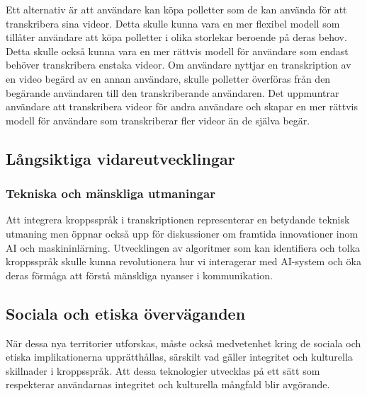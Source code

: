 Ett alternativ är att användare kan köpa polletter som de kan använda för att
transkribera sina videor. Detta skulle kunna vara en mer flexibel modell som
tillåter användare att köpa polletter i olika storlekar beroende på deras
behov. Detta skulle också kunna vara en mer rättvis modell för användare som
endast behöver transkribera enstaka videor. Om användare nyttjar en
transkription av en video begärd av en annan användare, skulle polletter
överföras från den begärande användaren till den transkriberande användaren.
Det uppmuntrar användare att transkribera videor för andra användare och
skapar en mer rättvis modell för användare som transkriberar fler videor än de
själva begär.

\subsection{Långsiktiga vidareutvecklingar}

\subsubsection{Tekniska och mänskliga utmaningar}
Att integrera kroppsspråk i transkriptionen representerar en betydande teknisk
utmaning men öppnar också upp för diskussioner om framtida innovationer inom
AI och maskininlärning. Utvecklingen av algoritmer som kan identifiera och
tolka kroppsspråk skulle kunna revolutionera hur vi interagerar med AI-system
och öka deras förmåga att förstå mänskliga nyanser i kommunikation.

\subsection{Sociala och etiska överväganden}
När dessa nya territorier utforskas, måste också medvetenhet kring de sociala och etiska implikationerna upprätthållas, särskilt vad gäller integritet och kulturella skillnader i kroppsspråk. Att dessa teknologier utvecklas på ett sätt som respekterar användarnas integritet och kulturella mångfald blir avgörande.
